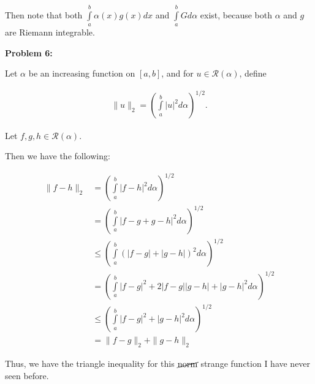\documentclass[a4paper,12pt]{article}
\newcommand{\shunt}{\vspace{20mm}}
\newcommand{\absval}[1]{\lvert #1 \rvert}
\newcommand{\norm}[1]{\|#1\|}
\newcommand{\al}{\alpha} %
\newcommand{\scrR}{\mathcal{R}}
\begin{document}
Then note that both $\int\limits_a^b \al(x)g(x)dx$ and $\int\limits_a^b Gd\al$ exist, because both $\al$ and $g$ are Riemann integrable.


\shunt

{\bf Problem 6:}

Let $\al$ be an increasing function on $[a,b]$, and for $u \in \scrR (\al)$, define

\begin{align*}
\norm{u}_2 = \left(\int\limits_a^b \absval{u}^2 d\al \right)^{1/2}.
\end{align*}

Let $f,g,h \in \scrR(\al)$.

Then we have the following:

\begin{align*}
\norm{f-h}_2 &= \left(\int\limits_a^b \absval{f-h}^2 d\al \right)^{1/2}\\
&= \left(\int\limits_a^b \absval{f-g+g-h}^2 d\al \right)^{1/2}\\
&\leq \left(\int\limits_a^b (\absval{f-g} + \absval{g-h})^2 d\al \right)^{1/2}\\
&= \left(\int\limits_a^b \absval{f-g}^2 + 2\absval{f-g}\absval{g-h} + \absval{g-h}^2 d\al \right)^{1/2}\\
&\leq \left(\int\limits_a^b \absval{f-g}^2 + \absval{g-h}^2 d\al \right)^{1/2}\\
&= \norm{f-g}_2 + \norm{g-h}_2
\end{align*}

Thus, we have the triangle inequality for this $\cancel{\text{norm}}$ strange function I have never seen before.

\shunt
\end{document}

